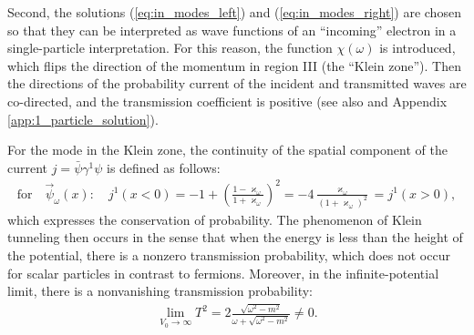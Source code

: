 \documentclass[12pt]{article}
\def\kappaw{\varkappa_{\omega}}
\def\psiwR{\overrightarrow{\psi}_{\omega}}
\numberwithin{equation}{section}
\begin{document}
Second, the solutions (\ref{eq:in_modes_left}) and (\ref{eq:in_modes_right}) are chosen so that they can be interpreted as wave functions of an ``incoming'' electron in a single-particle interpretation. For this reason, the function $\chi(\omega)$ is introduced, which flips the direction of the momentum in region III (the ``Klein zone''). Then the directions of the probability current of the incident and transmitted waves are co-directed, and the transmission coefficient is positive (see also \cite{ternov2024paradoks15483} and Appendix \ref{app:1_particle_solution}).

For the mode in the Klein zone, the continuity of the spatial component of the current $j=\bar{\psi}\gamma^1\psi$ is defined as follows:
\begin{gather}
    \text{for} \quad \psiwR(x) : \quad j^{1}(x<0)= -1+\left(\frac{1-\kappaw}{1+\kappaw}\right)^2=-4 \frac{\kappaw}{\left(1+\kappaw\right)^2}=j^1(x>0),
\end{gather}
which expresses the conservation of probability. The phenomenon of Klein tunneling then occurs in the sense that when the energy is less than the height of the potential, there is a nonzero transmission probability, which does not occur for scalar particles in contrast to fermions. Moreover, in the infinite-potential limit, there is a nonvanishing transmission probability:
\begin{align}
    \lim_{V_0 \to \infty} T^2= 2\frac{\sqrt{\omega^2-m^2}}{\omega+\sqrt{\omega^2-m^2}}\ne0.
\end{align}
\end{document}
